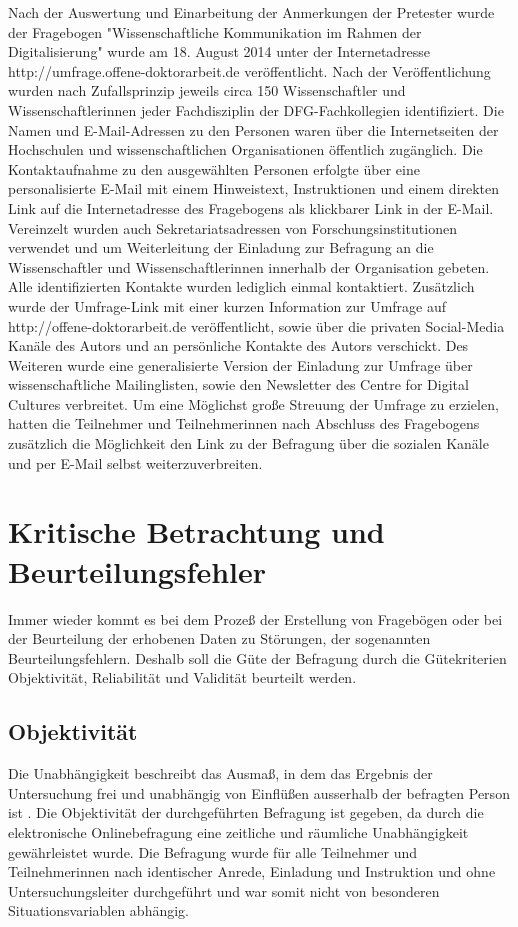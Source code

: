 Nach der Auswertung und Einarbeitung der Anmerkungen der Pretester wurde der Fragebogen "Wissenschaftliche Kommunikation im Rahmen der Digitalisierung" wurde am 18. August 2014 unter der Internetadresse http://umfrage.offene-doktorarbeit.de veröffentlicht. Nach der Veröffentlichung wurden nach Zufallsprinzip jeweils circa 150 Wissenschaftler und Wissenschaftlerinnen jeder Fachdisziplin der DFG-Fachkollegien identifiziert. Die Namen und E-Mail-Adressen zu den Personen waren über die Internetseiten der Hochschulen und wissenschaftlichen Organisationen öffentlich zugänglich. Die Kontaktaufnahme zu den ausgewählten Personen erfolgte über eine personalisierte E-Mail mit einem Hinweistext, Instruktionen und einem direkten Link auf die Internetadresse des Fragebogens als klickbarer Link in der E-Mail. Vereinzelt wurden auch Sekretariatsadressen von Forschungsinstitutionen verwendet und um Weiterleitung der Einladung zur Befragung an die Wissenschaftler und Wissenschaftlerinnen innerhalb der Organisation gebeten. Alle identifizierten Kontakte wurden lediglich einmal kontaktiert. Zusätzlich wurde der Umfrage-Link mit einer kurzen Information zur Umfrage auf http://offene-doktorarbeit.de veröffentlicht, sowie über die privaten Social-Media Kanäle des Autors und an persönliche Kontakte des Autors verschickt. Des Weiteren wurde eine generalisierte Version der Einladung zur Umfrage über wissenschaftliche Mailinglisten, sowie den Newsletter des Centre for Digital Cultures verbreitet. Um eine Möglichst große Streuung der Umfrage zu erzielen, hatten die Teilnehmer und Teilnehmerinnen nach Abschluss des Fragebogens zusätzlich die Möglichkeit den Link zu der Befragung über die sozialen Kanäle und per E-Mail selbst weiterzuverbreiten.

\section{Kritische Betrachtung und Beurteilungsfehler}

Immer wieder kommt es bei dem Prozeß der Erstellung von Fragebögen oder bei der Beurteilung der erhobenen Daten zu Störungen, der sogenannten Beurteilungsfehlern. Deshalb soll die Güte der Befragung durch die Gütekriterien Objektivität, Reliabilität und Validität beurteilt werden.

\subsection{Objektivität}

Die Unabhängigkeit beschreibt das Ausmaß, in dem das Ergebnis der Untersuchung frei und unabhängig von Einflüßen ausserhalb der befragten Person ist \cite{rost_2004_lehrbuch}. Die Objektivität der durchgeführten Befragung ist gegeben, da durch die elektronische Onlinebefragung eine zeitliche und räumliche Unabhängigkeit gewährleistet wurde. Die Befragung wurde für alle Teilnehmer und Teilnehmerinnen nach identischer Anrede, Einladung und Instruktion und ohne Untersuchungsleiter durchgeführt und war somit nicht von besonderen Situationsvariablen abhängig.


